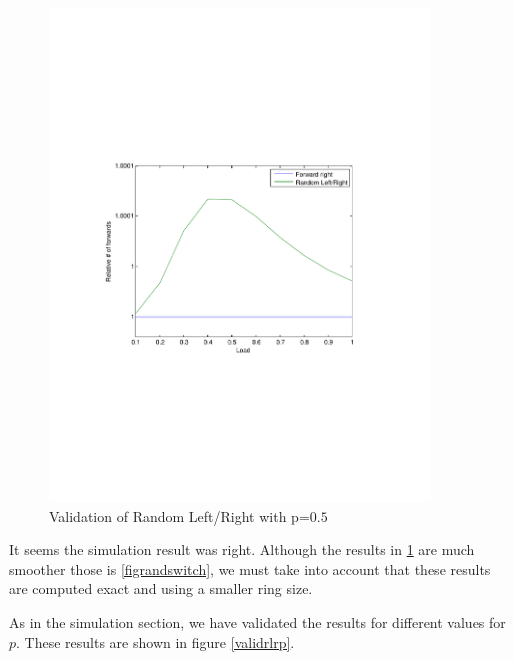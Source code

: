 \documentclass[10pt,a4paper]{article}
\begin{document}
\begin{figure}[h!tb]
\centering
\includegraphics[clip=true, trim=9em 24em 9em 24em, width=0.9\textwidth]{resources/plotrandlr.pdf}
\caption{Validation of Random Left/Right with p=$0.5$}
\label{validrlr}
\end{figure}

It seems the simulation result was right. Although the results in \ref{validrlr} are much smoother those is \ref{figrandswitch}, we must take into account that these results are computed exact and using a smaller ring size.

As in the simulation section, we have validated the results for different values for $p$. These results are shown in figure \ref{validrlrp}.
\end{document}
